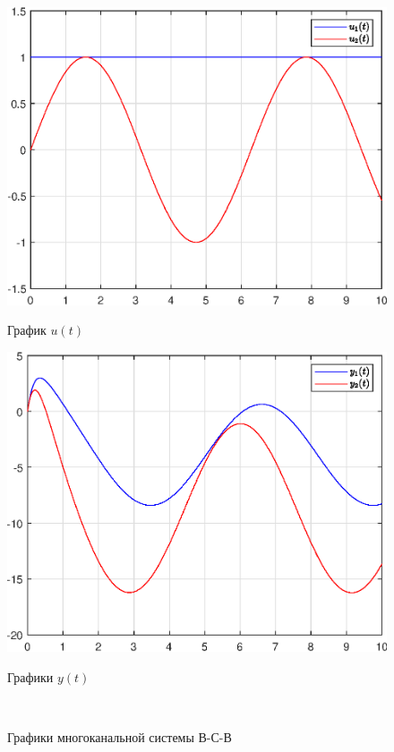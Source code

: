 \documentclass[a4paper]{article}
\begin{document}
\begin{figure}[H]
    \begin{minipage}{0.5\textwidth}
        \centering \includegraphics[width=\textwidth]{ex4/u.eps}
        \caption{График $u(t)$}
    \end{minipage}\hfill
    \begin{minipage}{0.5\textwidth}
        \centering \includegraphics[width=\textwidth]{ex4/y.eps}
        \caption{Графики $y(t)$}
    \end{minipage}\\[1em]
    \caption{Графики многоканальной системы В-С-В}
\end{figure}\noindent\
\end{document}
